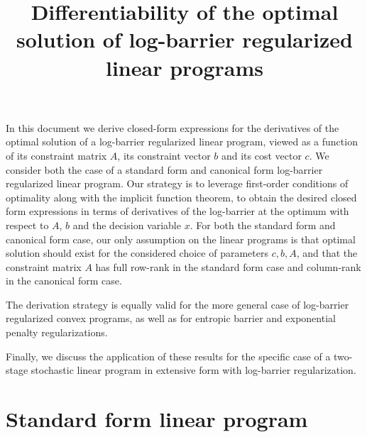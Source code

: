\documentclass[12pt]{article}
\title{Differentiability of the optimal solution of log-barrier regularized linear programs}
\begin{document}
\maketitle

In this document we derive closed-form expressions for the derivatives of the optimal solution 
of a log-barrier regularized linear program, viewed as a function of its constraint matrix $A$, 
its constraint vector $b$ and its cost vector $c$. 
We consider both the case of a standard form and canonical form log-barrier regularized linear program.
Our strategy is to leverage first-order conditions of optimality
along with the implicit function theorem, to obtain the desired closed form
expressions in terms of derivatives of the log-barrier at the optimum with respect to $A$, $b$ 
and the decision variable $x$.
For both the standard form and canonical form case, our only assumption on the linear programs is that 
optimal solution should exist for the considered choice of parameters $c, b , A$, and that the 
constraint matrix $A$ has full row-rank in the standard form case and column-rank in the canonical form case.

The derivation strategy is equally valid for the more general case of log-barrier 
regularized convex programs, as well as for entropic barrier and exponential penalty 
regularizations.

Finally, we discuss the application of these results for the specific case of a two-stage stochastic 
linear program in extensive form with log-barrier regularization.

\section{Standard form linear program}
\label{sec::Standard_form_linear_program}
\newcommand{\xopt}{\hat{x}(A,b,c)}
\end{document}
